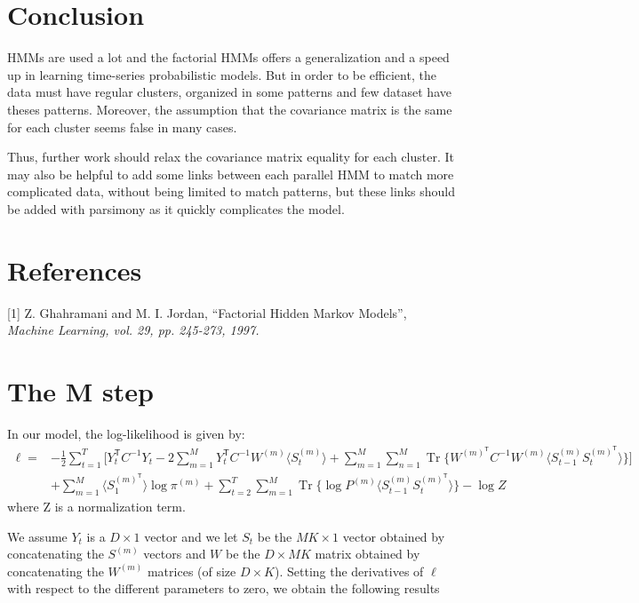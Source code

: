 \documentclass{article}
\DeclareMathOperator{\Tr}{Tr}
\begin{document}
\section{Conclusion}

HMMs are used a lot and the factorial HMMs offers a generalization and a speed up in learning time-series probabilistic models. But in order to be efficient, the data must have regular clusters, organized in some patterns and few dataset have theses patterns. Moreover, the assumption that the covariance matrix is the same for each cluster seems false in many cases.
\newline

Thus, further work should relax the covariance matrix equality for each cluster. It may also be helpful to add some links between each parallel HMM to match more complicated data, without being limited to match patterns, but these links should be added with parsimony as it quickly complicates the model.


\section*{References}

\small

[1] Z. Ghahramani and M. I. Jordan, ``Factorial Hidden Markov Models'', \it{Machine Learning}, vol. 29, pp. 245-273, 1997.

\normalsize

\appendix

\section{The M step}

In our model, the log-likelihood is given by:
\begin{align*}
\ell = &-\frac{1}{2} \sum_{t=1}^T \Bigg[Y_t^\mathsf{T} C^{-1} Y_t - 2 \sum_{m=1}^M Y_t^\mathsf{T} C^{-1} W^{(m)} \langle S_t^{(m)} \rangle + \sum_{m=1}^M \sum_{n=1}^M \Tr\bigg\{ W^{(m)^\mathsf{T}} C^{-1} W^{(m)} \langle S_{t-1}^{(m)} S_{t}^{(m)^\mathsf{T}} \rangle \bigg\} \Bigg] \\
&+ \sum_{m=1}^M \langle S_1^{(m)^\mathsf{T}} \rangle \log \pi^{(m)} + \sum_{t=2}^T \sum_{m=1}^M \Tr\Big\{ \log P^{(m)} \langle S_{t-1}^{(m)} S_{t}^{(m)^\mathsf{T}} \rangle \Big\} - \log Z
\end{align*} 
where Z is a normalization term.

We assume $Y_t$ is a $D \times 1$ vector and we let $S_t$ be the $MK \times 1$ vector obtained by concatenating the $S^{(m)}$ vectors and $W$ be the $D \times MK$ matrix obtained by concatenating the $W^{(m)}$ matrices (of size $D \times K$). Setting the derivatives of $\ell$ with respect to the different parameters to zero, we obtain the following results
\end{document}
